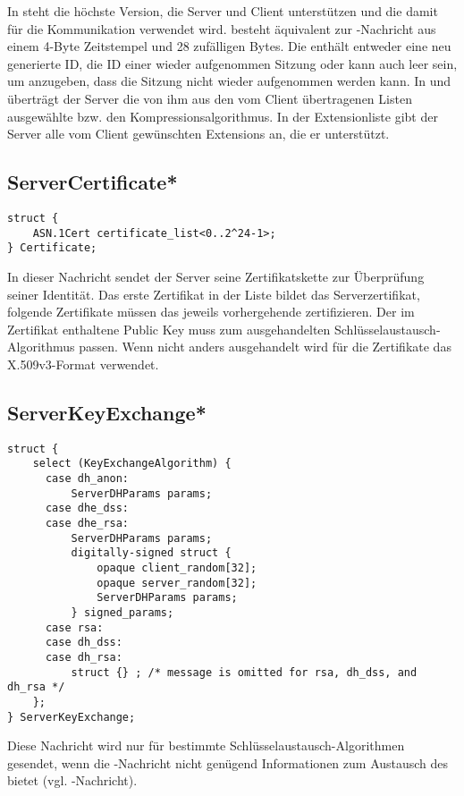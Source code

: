 In  steht die höchste Version, die Server und Client unterstützen und die damit für die Kommunikation verwendet wird.  besteht äquivalent zur \clienthello{}-Nachricht aus einem 4-Byte Zeitstempel und 28 zufälligen Bytes. Die  enthält entweder eine neu generierte ID, die ID einer wieder aufgenommen Sitzung oder kann auch leer sein, um anzugeben, dass die Sitzung nicht wieder aufgenommen werden kann. In  und  überträgt der Server die von ihm aus den vom Client übertragenen Listen ausgewählte \ciphersuite{} bzw. den Kompressionsalgorithmus. In der Extensionliste gibt der Server alle vom Client gewünschten Extensions an, die er unterstützt.

\subsection*{ServerCertificate*}

\begin{lstlisting}
struct {
	ASN.1Cert certificate_list<0..2^24-1>;
} Certificate;
\end{lstlisting}

In dieser Nachricht sendet der Server seine Zertifikatskette zur Überprüfung seiner Identität. Das erste Zertifikat in der Liste bildet das Serverzertifikat, folgende Zertifikate müssen das jeweils vorhergehende zertifizieren. Der im Zertifikat enthaltene Public Key muss zum ausgehandelten Schlüsselaustausch-Algorithmus passen. Wenn nicht anders ausgehandelt wird für die Zertifikate das X.509v3-Format verwendet.

\subsection*{ServerKeyExchange*}

\begin{lstlisting}
struct {
	select (KeyExchangeAlgorithm) {
	  case dh_anon:
	      ServerDHParams params;
	  case dhe_dss:
	  case dhe_rsa:
	      ServerDHParams params;
	      digitally-signed struct {
	          opaque client_random[32];
	          opaque server_random[32];
	          ServerDHParams params;
	      } signed_params;
	  case rsa:
	  case dh_dss:
	  case dh_rsa:
	      struct {} ; /* message is omitted for rsa, dh_dss, and dh_rsa */
	};
} ServerKeyExchange;
\end{lstlisting}

Diese Nachricht wird nur für bestimmte Schlüsselaustausch-Algorithmen gesendet, wenn die \servercertificate{}-Nachricht nicht genügend Informationen zum Austausch des \premastersecret{} bietet (vgl. \clientkeyexchange{}-Nachricht).

